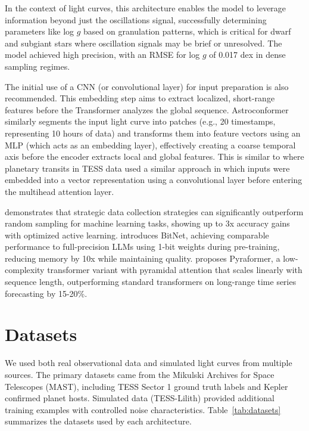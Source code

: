 \documentclass[letterpaper]{article} %
\begin{document}
In the context of light curves, this architecture enables the model to leverage information beyond just the oscillations signal, successfully determining parameters like log $g$ based on granulation patterns, which is critical for dwarf and subgiant stars where oscillation signals may be brief or unresolved. The model achieved high precision, with an RMSE for log $g$ of 0.017 dex in dense sampling regimes.

The initial use of a CNN (or convolutional layer) for input preparation is also recommended. This embedding step aims to extract localized, short-range features before the Transformer analyzes the global sequence. Astroconformer similarly segments the input light curve into patches (e.g., 20 timestamps, representing 10 hours of data) and transforms them into feature vectors using an MLP (which acts as an embedding layer), effectively creating a coarse temporal axis before the encoder extracts local and global features. This is similar to \cite{salinas2023distinguishingtransitfalsepositives} where planetary transits in TESS data used a similar approach in which inputs were embedded into a vector representation using a convolutional layer before entering the multihead attention layer. 

\cite{2025optimizedata} demonstrates that strategic data collection strategies can significantly outperform random sampling for machine learning tasks, showing up to 3x accuracy gains with optimized active learning. \cite{bitnet2025} introduces BitNet, achieving comparable performance to full-precision LLMs using 1-bit weights during pre-training, reducing memory by 10x while maintaining quality. \cite{liu2022pyraformer} proposes Pyraformer, a low-complexity transformer variant with pyramidal attention that scales linearly with sequence length, outperforming standard transformers on long-range time series forecasting by 15-20\%.

\section*{Datasets}
We used both real observational data and simulated light curves from multiple sources. The primary datasets came from the Mikulski Archives for Space Telescopes (MAST), including TESS Sector 1 ground truth labels and Kepler confirmed planet hosts. Simulated data (TESS-Lilith) provided additional training examples with controlled noise characteristics. Table~\ref{tab:datasets} summarizes the datasets used by each architecture.
\end{document}
